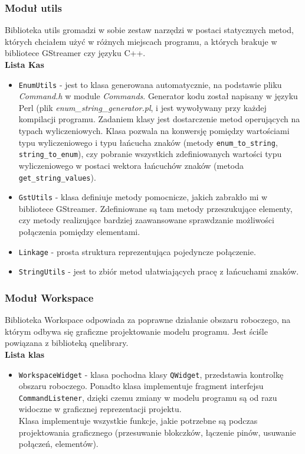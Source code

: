 \documentclass[12pt]{article}
\begin{document}
\subsubsection{Moduł utils}
Biblioteka utils gromadzi w sobie zestaw narzędzi w postaci statycznych metod, których chciałem użyć w różnych miejscach programu, a których brakuje w bibliotece GStreamer czy języku C++.\\
\textbf{Lista Kas}
\begin{itemize}
 \setlength{\itemsep}{0em}
\item \texttt{EnumUtils} - jest to klasa generowana automatycznie, na podstawie pliku \textit{Command.h} w module \textit{Commands}. Generator kodu został napisany w języku Perl (plik \textit{enum\_string\_generator.pl}, i jest wywoływany przy każdej kompilacji programu.
Zadaniem klasy jest dostarczenie metod operujących na typach wyliczeniowych. Klasa pozwala na konwersję pomiędzy wartościami typu wyliczeniowego i typu łańcucha znaków (metody \texttt{enum\_to\_string}, \texttt{string\_to\_enum}), czy pobranie wszystkich zdefiniowanych wartości typu wyliczeniowego w postaci wektora łańcuchów znaków (metoda \texttt{get\_string\_values}).
\item \texttt{GstUtils} - klasa definiuje metody pomocnicze, jakich zabrakło mi w bibliotece GStreamer. Zdefiniowane są tam metody przeszukujące elementy, czy metody realizujące bardziej zaawansowane sprawdzanie możliwości połączenia pomiędzy elementami.
\item \texttt{Linkage} - prosta struktura reprezentująca pojedyncze połączenie.
\item \texttt{StringUtils} - jest to zbiór metod ułatwiających pracę z łańcuchami znaków.
\end{itemize}
\subsubsection{Moduł Workspace}
Biblioteka Workspace odpowiada za poprawne działanie obszaru roboczego, na którym odbywa się graficzne projektowanie modelu programu. Jest ściśle powiązana z biblioteką qnelibrary.\\
\textbf{Lista klas}
\begin{itemize}
  \setlength{\itemsep}{0em}
\item \texttt{WorkspaceWidget} - klasa pochodna klasy \texttt{QWidget}, przedstawia kontrolkę obszaru roboczego. Ponadto klasa implementuje fragment interfejsu \texttt{CommandListener}, dzięki czemu zmiany w modelu programu są od razu widoczne w graficznej reprezentacji projektu. \\
Klasa implementuje wszystkie funkcje, jakie potrzebne są podczas projektowania graficznego (przesuwanie blokczków, łączenie pinów, usuwanie połączeń, elementów).
\end{itemize}
\cleardoublepage
\end{document}
